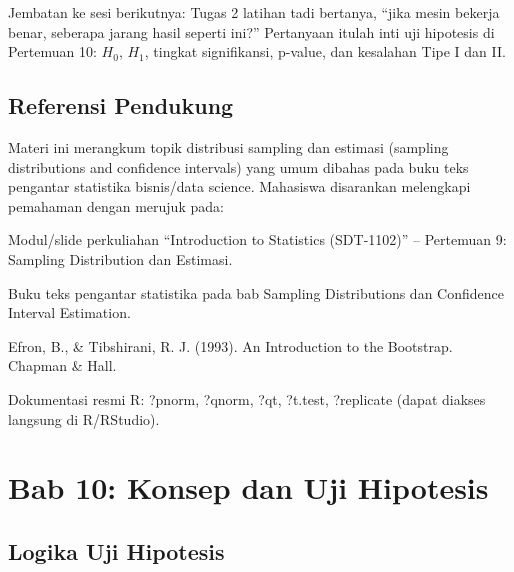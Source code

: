 \documentclass[
  indonesian,
  letterpaper,
]{book}
\begin{document}
Jembatan ke sesi berikutnya: Tugas 2 latihan tadi bertanya, ``jika mesin
bekerja benar, seberapa jarang hasil seperti ini?'' Pertanyaan itulah
inti uji hipotesis di Pertemuan 10: \(H_0\), \(H_1\), tingkat
signifikansi, p-value, dan kesalahan Tipe I dan II.

\section{Referensi Pendukung}\label{referensi-pendukung}

Materi ini merangkum topik distribusi sampling dan estimasi (sampling
distributions and confidence intervals) yang umum dibahas pada buku teks
pengantar statistika bisnis/data science. Mahasiswa disarankan
melengkapi pemahaman dengan merujuk pada:

Modul/slide perkuliahan ``Introduction to Statistics (SDT-1102)'' --
Pertemuan 9: Sampling Distribution dan Estimasi.

Buku teks pengantar statistika pada bab Sampling Distributions dan
Confidence Interval Estimation.

Efron, B., \& Tibshirani, R. J. (1993). An Introduction to the
Bootstrap. Chapman \& Hall.

Dokumentasi resmi R: ?pnorm, ?qnorm, ?qt, ?t.test, ?replicate (dapat
diakses langsung di R/RStudio).


\chapter{Bab 10: Konsep dan Uji
Hipotesis}\label{bab-10-konsep-dan-uji-hipotesis}

\section{Logika Uji Hipotesis}\label{logika-uji-hipotesis}
\end{document}
